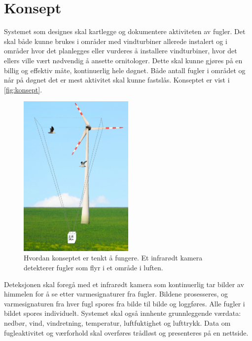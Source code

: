 \section{Konsept}
\label{sec:konsept}

Systemet som designes skal kartlegge og dokumentere aktiviteten av fugler. Det skal både kunne brukes i områder med vindturbiner allerede instalert og i områder hvor det planlegges eller vurderes å installere vindturbiner, hvor det ellers ville vært nødvendig å ansette ornitologer. Dette skal kunne gjøres på en billig og effektiv måte, kontinuerlig hele døgnet. Både antall fugler i området og når på døgnet det er mest aktivitet skal kunne fastslås. Konseptet er vist i \autoref{fig:konsept}.



\begin{figure}[H]
    \centering
    \includegraphics[width=0.5\textwidth]{konsept/KonseptBilde.png}
    \caption{Hvordan konseptet er tenkt å fungere. Et infrarødt kamera detekterer fugler som flyr i et område i luften. }
    \label{fig:konsept}
\end{figure}


Deteksjonen skal foregå med et infrarødt kamera som kontinuerlig tar bilder av himmelen for å se etter varmesignaturer fra fugler. Bildene prosesseres, og varmesignaturen fra hver fugl spores fra bilde til bilde og loggføres. Alle fugler i bildet spores individuelt. Systemet skal også innhente grunnleggende værdata: nedbør, vind, vindretning, temperatur, luftfuktighet og lufttrykk. Data om fugleaktivitet og værforhold skal overføres trådløst og presenteres på en nettside.



